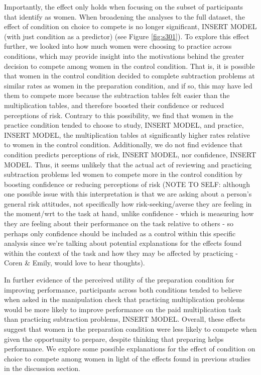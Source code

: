 \documentclass[a4paper, nobind]{templates/ociamthesis}
\begin{document}
Importantly, the effect only holds when focusing on the subset of participants that identify as women. When broadening the analyses to the full dataset, the effect of condition on choice to compete is no longer significant, INSERT MODEL (with just condition as a predictor) (see Figure \ref{fig:s301}). To explore this effect further, we looked into how much women were choosing to practice across conditions, which may provide insight into the motivations behind the greater decision to compete among women in the control condition. That is, it is possible that women in the control condition decided to complete subtraction problems at similar rates as women in the preparation condition, and if so, this may have led them to compete more because the subtraction tables felt easier than the multiplication tables, and therefore boosted their confidence or reduced perceptions of risk. Contrary to this possibility, we find that women in the practice condition tended to choose to study, INSERT MODEL, and practice, INSERT MODEL, the multiplication tables at significantly higher rates relative to women in the control condition. Additionally, we do not find evidence that condition predicts perceptions of risk, INSERT MODEL, nor confidence, INSERT MODEL. Thus, it seems unlikely that the actual act of reviewing and practicing subtraction problems led women to compete more in the control condition by boosting confidence or reducing perceptions of risk (NOTE TO SELF: although one possible issue with this interpretation is that we are asking about a person's general risk attitudes, not specifically how risk-seeking/averse they are feeling in the moment/wrt to the task at hand, unlike confidence - which is measuring how they are feeling about their performance on the task relative to others - so perhaps only confidence should be included as a control within this specific analysis since we're talking about potential explanations for the effects found within the context of the task and how they may be affected by practicing - Coren \& Emily, would love to hear thoughts).

In further evidence of the perceived utility of the preparation condition for improving performance, participants across both conditions tended to believe when asked in the manipulation check that practicing multiplication problems would be more likely to improve performance on the paid multiplication task than practicing subtraction problems, INSERT MODEL. Overall, these effects suggest that women in the preparation condition were less likely to compete when given the opportunity to prepare, despite thinking that preparing helps performance. We explore some possible explanations for the effect of condition on choice to compete among women in light of the effects found in previous studies in the discussion section.
\end{document}
